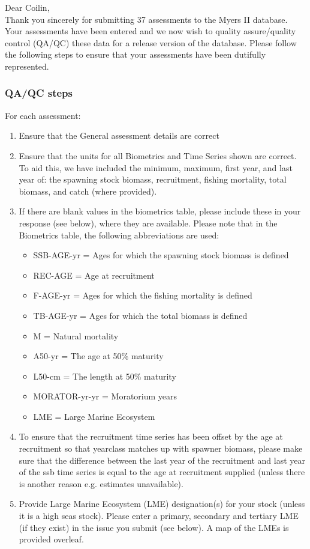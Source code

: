 \documentclass [a4paper, 10pt] {article}
\begin{document}
\noindent Dear Coilin,\\

\noindent Thank you sincerely for submitting 37 assessments to the Myers II database. Your assessments have been entered and we now wish to quality assure/quality control (QA/QC) these data for a release version of the database. Please follow the following steps to ensure that your assessments have been dutifully represented.
\subsubsection{QA/QC steps}
For each assessment:
\begin{enumerate}
\item Ensure that the General assessment details are correct
\item Ensure that the units for all Biometrics and Time Series shown are correct. To aid this, we have included the minimum, maximum, first year, and last year of: the spawning stock biomass, recruitment, fishing mortality, total biomass, and  catch  (where provided). 
\item If there are blank values in the biometrics table, please include these in your response (see below), where they are available.
Please note that in the Biometrics table, the following abbreviations are used:
\begin{itemize}
\item SSB-AGE-yr  = Ages for which the spawning stock biomass is defined
\item REC-AGE     = Age at recruitment
\item F-AGE-yr    = Ages for which the fishing mortality is defined 
\item TB-AGE-yr   = Ages for which the total biomass is defined
\item M      = Natural mortality
\item A50-yr      = The age at 50\% maturity
\item L50-cm      = The length at 50\% maturity
\item MORATOR-yr-yr = Moratorium years
\item LME = Large Marine Ecosystem\\
\end{itemize}
\item To ensure that the recruitment time series has been offset by the age at recruitment so that yearclass matches up with spawner biomass, please make sure that the difference between the last year of the recruitment and last year of the ssb time series is equal to the age at recruitment supplied (unless there is another reason e.g. estimates unavailable). 
\item Provide Large Marine Ecosystem (LME) designation(s) for your stock (unless it is a high seas stock). Please enter a primary, secondary and tertiary LME (if they exist) in the issue you submit (see below). A map of the LMEs is provided overleaf. 
\end{enumerate}
\vspace{-.25in}
\end{document}
